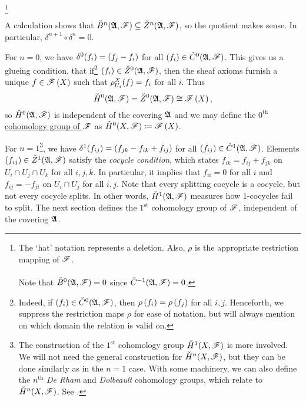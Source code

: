 \documentclass[../Moduli_Spaces_of_Riemann_Surfaces.tex]{subfiles}
\begin{document}
    \footnote{The `hat' notation represents a deletion. Also, $\rho$ is the appropriate restriction mapping of $\mathscr{F}$.\\\ \\
    Note that $\check{B}^0\!\left(\mathfrak{A},\mathscr{F}\right)=0$ since $\check{C}^{-1}\!\left(\mathfrak{A},\mathscr{F}\right)=0$.}
    \vspace{-0.05in}
    \begin{remark}
        A calculation shows that $\check{B}^n\!\left(\mathfrak{A},\mathscr{F}\right)\subseteq\check{Z}^n\!\left(\mathfrak{A},\mathscr{F}\right)$, so the quotient makes sense. In particular, $\delta^{n+1}\circ\delta^n=0$.\exqed
    \end{remark}
    \begin{remark}
        For $n=0$, we have $\delta^0\!\left(f_i\right)=\left(f_j-f_i\right)$ for all $\left(f_i\right)\in\check{C}^0\!\left(\mathfrak{A},\mathscr{F}\right)$. This gives us a glueing condition, that if\footnote{Indeed, if $\left(f_i\right)\in\check{C}^0\!\left(\mathfrak{A},\mathscr{F}\right)$, then $\rho\left(f_i\right)=\rho\left(f_j\right)$ for all $i,j$. Henceforth, we suppress the restriction maps $\rho$ for ease of notation, but will always mention on which domain the relation is valid on.} $\left(f_i\right)\in\check{Z}^0\!\left(\mathfrak{A},\mathscr{F}\right)$, then the sheaf axioms furnish a unique $f\in\mathscr{F}\left(X\right)$ such that $\rho^X_{U_i}\!\left(f\right)=f_i$ for all $i$. Thus
        \begin{equation*}
            \check{H}^0\!\left(\mathfrak{A},\mathscr{F}\right)=\check{Z}^0\!\left(\mathfrak{A},\mathscr{F}\right)\cong\mathscr{F}\left(X\right),
        \end{equation*}
        so $\check{H}^0\!\left(\mathfrak{A},\mathscr{F}\right)$ is independent of the covering $\mathfrak{A}$ and we may define the \ul{$0^\textrm{th}$ cohomology group of $\mathscr{F}$} as $\check{H}^0\!\left(X,\mathscr{F}\right)\coloneqq\mathscr{F}\left(X\right)$.\exqed
    \end{remark}
    \begin{remark}
        For $n=1$\footnote{The construction of the $1^\textrm{st}$ cohomology group $\check{H}^1\!\left(X,\mathscr{F}\right)$ is more involved. We will not need the general construction for $\check{H}^n\!\left(X,\mathscr{F}\right)$, but they can be done similarly as in the $n=1$ case. With some machinery, we can also define the $n^\textrm{th}$ \textit{De Rham} and \textit{Dolbeault} cohomology groups, which relate to $\check{H}^n\!\left(X,\mathscr{F}\right)$. See \cite[][Section IX.4]{miranda}.}, we have $\delta^1\!\left(f_{ij}\right)=\left(f_{jk}-f_{ik}+f_{ij}\right)$ for all $\left(f_{ij}\right)\in\check{C}^1\!\left(\mathfrak{A},\mathscr{F}\right)$. Elements $\left(f_{ij}\right)\in\check{Z}^1\!\left(\mathfrak{A},\mathscr{F}\right)$ satisfy the \textit{cocycle condition}, which states $f_{ik}=f_{ij}+f_{jk}$ on $U_i\cap U_j\cap U_k$ for all $i,j,k$. In particular, it implies that $f_{ii}=0$ for all $i$ and $f_{ij}=-f_{ji}$ on $U_i\cap U_j$ for all $i,j$. Note that every splitting cocycle is a cocycle, but not every cocycle splits. In other words, $\check{H}^1\!\left(\mathfrak{A},\mathscr{F}\right)$ measures how $1$-cocycles fail to split. The next section defines the $1^\textrm{st}$ cohomology group of $\mathscr{F}$, independent of the covering $\mathfrak{A}$.\exqed
    \end{remark}
\end{document}
